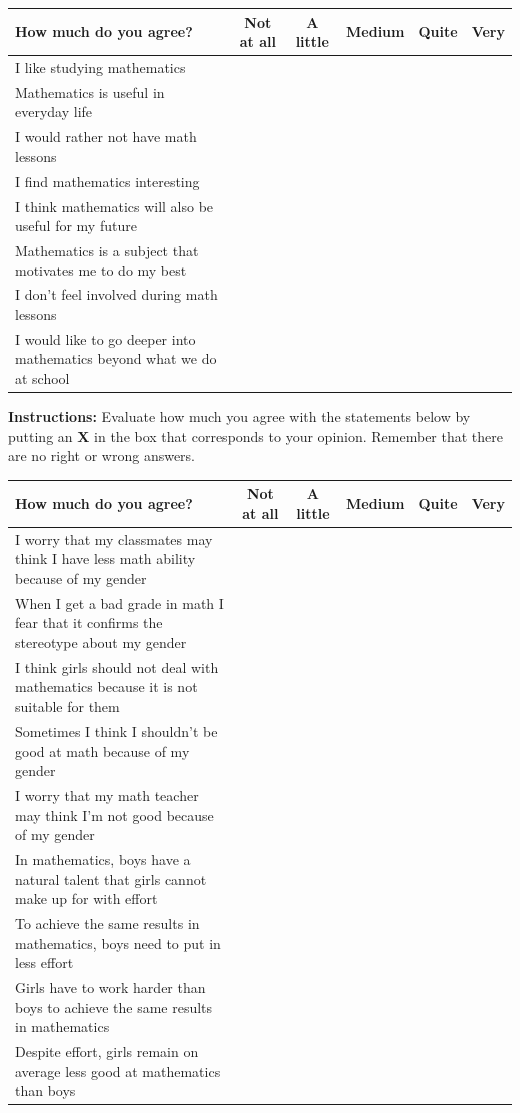 \documentclass[11pt]{article}
\begin{document}
\noindent\begin{tabular}{|p{7cm}|c|c|c|c|c|}
  \hline
  \textbf{How much do you agree?} & \textbf{Not at all} & \textbf{A little} & \textbf{Medium} & \textbf{Quite} & \textbf{Very} \\
  \hline
  I like studying mathematics & & & & & \\
  \hline
  Mathematics is useful in everyday life & & & & & \\
  \hline
  I would rather not have math lessons & & & & & \\
  \hline
  I find mathematics interesting & & & & & \\
  \hline
  I think mathematics will also be useful for my future & & & & & \\
  \hline
  Mathematics is a subject that motivates me to do my best & & & & & \\
  \hline 
  I don’t feel involved during math lessons & & & & & \\
  \hline
  I would like to go deeper into mathematics beyond what we do at school & & & & & \\
  \hline
\end{tabular}

\newpage

\noindent\textbf{Instructions:} Evaluate how much you agree with the statements below by putting an \textbf{X} in the box that corresponds to your opinion. Remember that there are no right or wrong answers. 
\newline

\noindent\begin{tabular}{|p{7cm}|c|c|c|c|c|}
  \hline
  \textbf{How much do you agree?} & \textbf{Not at all} & \textbf{A little} & \textbf{Medium} & \textbf{Quite} & \textbf{Very} \\
  \hline
  I worry that my classmates may think I have less math ability because of my gender & & & & & \\
  \hline
  When I get a bad grade in math I fear that it confirms the stereotype about my gender & & & & & \\
  \hline
  I think girls should not deal with mathematics because it is not suitable for them & & & & & \\
  \hline
  Sometimes I think I shouldn’t be good at math because of my gender & & & & & \\
  \hline
  I worry that my math teacher may think I’m not good because of my gender & & & & & \\
  \hline
  In mathematics, boys have a natural talent that girls cannot make up for with effort & & & & & \\
  \hline 
  To achieve the same results in mathematics, boys need to put in less effort & & & & & \\
  \hline
  Girls have to work harder than boys to achieve the same results in mathematics & & & & & \\
  \hline
  Despite effort, girls remain on average less good at mathematics than boys & & & & & \\
  \hline
\end{tabular}
\end{document}
